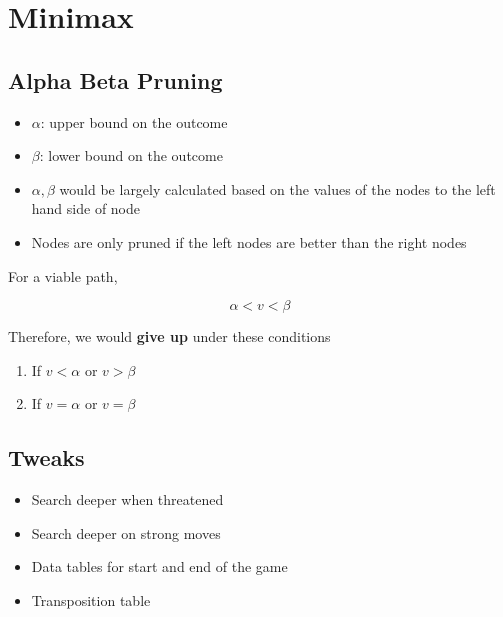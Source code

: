 \section{Minimax}

  \subsection{Alpha Beta Pruning}

    \begin{itemize}
      \item $ \alpha $: upper bound on the outcome
      \item $ \beta $: lower bound on the outcome
      \item $ \alpha, \beta $ would be largely calculated based on the values
      of the nodes to the left hand side of  node
      \item Nodes are only pruned if the left nodes are better than
      the right nodes
    \end{itemize}

    For a viable path,

    \begin{equation}
      \alpha < v < \beta
    \end{equation}

    Therefore, we would \textbf{give up} under these conditions

    \begin{enumerate}
      \item If $ v < \alpha $ or $ v > \beta $
      \item If $ v = \alpha $ or $ v = \beta $
    \end{enumerate}

  \subsection{Tweaks}

    \begin{itemize}
      \item Search deeper when threatened
      \item Search deeper on strong moves
      \item Data tables for start and end of the game
      \item Transposition table
    \end{itemize}